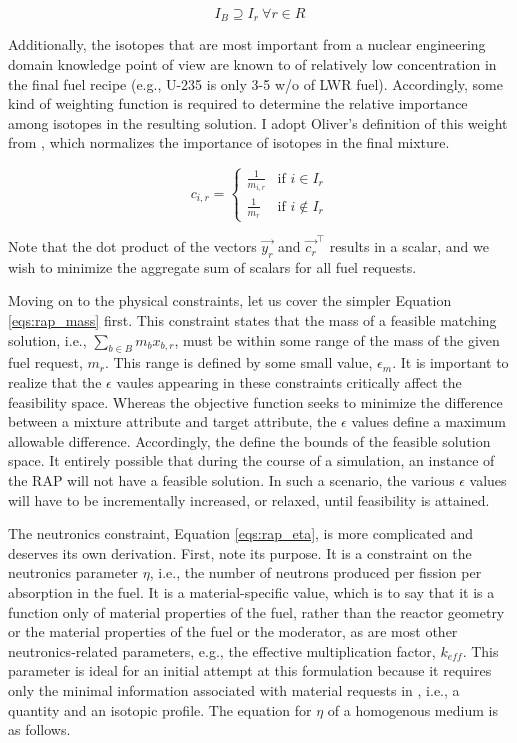 \begin{equation}
\label{eqs:barrel-req-iso}
I_{B} \supseteq I_{r} \: \forall r \in R
\end{equation}

Additionally, the isotopes that are most important from a nuclear engineering
domain knowledge point of view are known to of relatively low concentration in
the final fuel recipe (e.g., U-235 is only 3-5 w/o of LWR fuel). Accordingly,
some kind of weighting function is required to determine the relative importance
among isotopes in the resulting solution. I adopt Oliver's definition of this
weight from \cite{oliver_geniusv2:_2009}, which normalizes the importance of
isotopes in the final mixture.

\begin{equation}
c_{i,r} = 
\begin{cases}
 \frac{1}{m_{i,r}} & \text{if } i \in I_{r} \\
 \frac{1}{m_{r}}   & \text{if } i \not\in I_{r}
\end{cases}
\end{equation}

Note that the dot product of the vectors $\vec{y_{r}}$ and $\vec{c_{r}}^{\top}$
results in a scalar, and we wish to minimize the aggregate sum of scalars for
all fuel requests.

Moving on to the physical constraints, let us cover the simpler
Equation \ref{eqs:rap_mass} first. This constraint states that the mass of a
feasible matching solution, i.e., $\sum_{b \in B} m_{b} x_{b,r}$, must be within
some range of the mass of the given fuel request, $m_{r}$. This range is defined
by some small value, $\epsilon_{m}$. It is important to realize that the
$\epsilon$ vaules appearing in these constraints critically affect the
feasibility space. Whereas the objective function seeks to minimize the
difference between a mixture attribute and target attribute, the $\epsilon$
values define a maximum allowable difference. Accordingly, the define the bounds
of the feasible solution space. It entirely possible that during the course of a
simulation, an instance of the RAP will not have a feasible solution. In such a
scenario, the various $\epsilon$ values will have to be incrementally increased,
or relaxed, until feasibility is attained.

The neutronics constraint, Equation \ref{eqs:rap_eta}, is more complicated and
deserves its own derivation. First, note its purpose. It is a constraint on the
neutronics parameter $\eta$, i.e., the number of neutrons produced per fission
per absorption in the fuel. It is a material-specific value, which is to say
that it is a function only of material properties of the fuel, rather than the
reactor geometry or the material properties of the fuel or the moderator, as are
most other neutronics-related parameters, e.g., the effective multiplication
factor, $k_{eff}$. This parameter is ideal for an initial attempt at this
formulation because it requires only the minimal information associated with
material requests in \Cyclus, i.e., a quantity and an isotopic profile. The
equation for $\eta$ of a homogenous medium is as follows.

